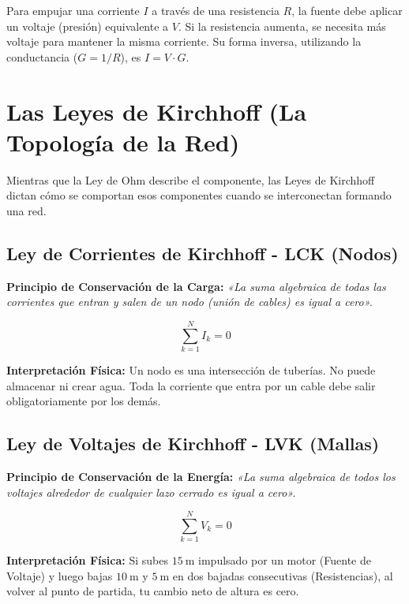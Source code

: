 \documentclass[11pt, a4paper]{article}
\begin{document}
\begin{tcolorbox}[caja_fisica, title=Interpretación Física]
Para empujar una corriente $I$ a través de una resistencia $R$, la fuente debe aplicar un voltaje (presión) equivalente a $V$. Si la resistencia aumenta, se necesita más voltaje para mantener la misma corriente. Su forma inversa, utilizando la conductancia ($G = 1/R$), es $I = V \cdot G$.
\end{tcolorbox}

\section{Las Leyes de Kirchhoff (La Topología de la Red)}
Mientras que la Ley de Ohm describe el componente, las Leyes de Kirchhoff dictan cómo se comportan esos componentes cuando se interconectan formando una red.

\subsection{Ley de Corrientes de Kirchhoff - LCK (Nodos)}
\textbf{Principio de Conservación de la Carga:} \textit{«La suma algebraica de todas las corrientes que entran y salen de un nodo (unión de cables) es igual a cero».}

\begin{equation}
    \sum_{k=1}^{N} I_k = 0
\end{equation}

\noindent\textbf{Interpretación Física:} Un nodo es una intersección de tuberías. No puede almacenar ni crear agua. Toda la corriente que entra por un cable debe salir obligatoriamente por los demás.

\subsection{Ley de Voltajes de Kirchhoff - LVK (Mallas)}
\textbf{Principio de Conservación de la Energía:} \textit{«La suma algebraica de todos los voltajes alrededor de cualquier lazo cerrado es igual a cero».}

\begin{equation}
    \sum_{k=1}^{N} V_k = 0
\end{equation}

\noindent\textbf{Interpretación Física:} Si subes $\qty{15}{\meter}$ impulsado por un motor (Fuente de Voltaje) y luego bajas $\qty{10}{\meter}$ y $\qty{5}{\meter}$ en dos bajadas consecutivas (Resistencias), al volver al punto de partida, tu cambio neto de altura es cero.
\end{document}

